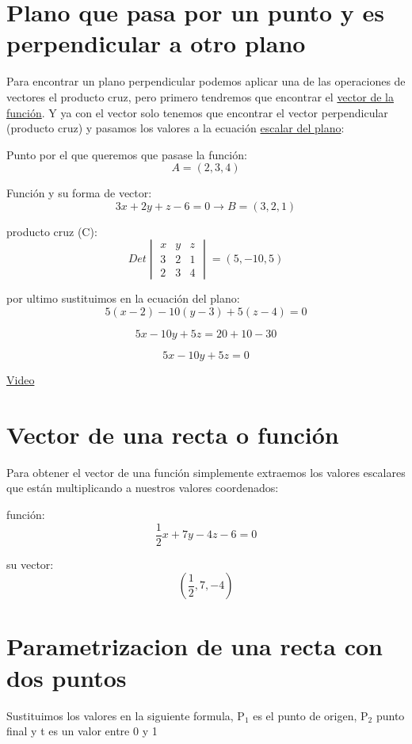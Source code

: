 \documentclass[11pt]{article}
\begin{document}
\section{Plano que pasa por un punto y es perpendicular a otro plano}
\label{sec:org8339af4}
Para encontrar un plano perpendicular podemos aplicar una de las operaciones de vectores el producto cruz, pero primero tendremos que encontrar el \hyperref[sec:org862a355]{vector de la función}. Y ya con el vector solo tenemos que encontrar el vector perpendicular (producto cruz) y pasamos los valores a la ecuación \hyperref[sec:org7c32d6d]{escalar del plano}:

\begin{DEMONSTRATION}
Punto por el que queremos que pasase la función:
\[
A = (2,3,4)
\]

Función y su forma de vector:
\[ 
3x+2y+z-6=0 \rightarrow B = (3,2,1)
\]

producto cruz (C):
\[
Det \begin{vmatrix}
x & y & z\\
3 & 2 & 1\\
2 & 3 & 4
\end{vmatrix} = (5, -10, 5)
\]

por ultimo sustituimos en la ecuación del plano:
\[
5(x-2)-10(y-3)+5(z-4) = 0
\]

\[
5x-10y+5z = 20+10-30 
\]

\[
\boxed{5x-10y+5z = 0}
\]
\end{DEMONSTRATION}

\href{https://www.youtube.com/watch?v=RkMxfogdWJ0}{Video} 

\section{Vector de una recta o función}
\label{sec:org862a355}
Para obtener el vector de una función simplemente extraemos los valores escalares que están multiplicando a nuestros valores coordenados:

\begin{DEMONSTRATION}
función:
\[ \frac{1}{2} x + 7y - 4z - 6 = 0 \]

su vector:
\[ (\frac{1}{2}, 7, -4) \]
\end{DEMONSTRATION}

\section{Parametrizacion de una recta con dos puntos}
\label{sec:org3af52e6}
Sustituimos los valores en la siguiente formula, P\(_{\text{1}}\) es el punto de origen, P\(_{\text{2}}\) punto final y t es un valor entre 0 y 1
\end{document}
